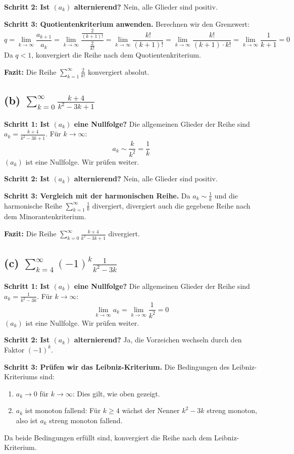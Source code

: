 \documentclass[11pt]{article}
\begin{document}
\textbf{Schritt 2: Ist \((a_k)\) alternierend?}
Nein, alle Glieder sind positiv.

\textbf{Schritt 3: Quotientenkriterium anwenden.}
Berechnen wir den Grenzwert:
\[
q = \lim_{k \to \infty} \frac{a_{k+1}}{a_k} = \lim_{k \to \infty} \frac{\frac{2}{(k+1)!}}{\frac{2}{k!}} = \lim_{k \to \infty} \frac{k!}{(k+1)!} = \lim_{k \to \infty} \frac{k!}{(k+1) \cdot k!} = \lim_{k \to \infty} \frac{1}{k+1} = 0
\]
Da \(q < 1\), konvergiert die Reihe nach dem Quotientenkriterium.

\textbf{Fazit:} Die Reihe \(\sum_{k=1}^\infty \frac{2}{k!}\) konvergiert absolut.

\subsection*{(b) \(\sum_{k=0}^\infty \frac{k+4}{k^2 - 3k + 1}\)}

\textbf{Schritt 1: Ist \((a_k)\) eine Nullfolge?}
Die allgemeinen Glieder der Reihe sind \(a_k = \frac{k+4}{k^2 - 3k + 1}\). Für \(k \to \infty\):
\[
a_k \sim \frac{k}{k^2} = \frac{1}{k}
\]
\((a_k)\) ist eine Nullfolge. Wir prüfen weiter.

\textbf{Schritt 2: Ist \((a_k)\) alternierend?}
Nein, alle Glieder sind positiv.

\textbf{Schritt 3: Vergleich mit der harmonischen Reihe.}
Da \(a_k \sim \frac{1}{k}\) und die harmonische Reihe \(\sum_{k=1}^\infty \frac{1}{k}\) divergiert, divergiert auch die gegebene Reihe nach dem Minorantenkriterium.

\textbf{Fazit:} Die Reihe \(\sum_{k=0}^\infty \frac{k+4}{k^2 - 3k + 1}\) divergiert.

\subsection*{(c) \(\sum_{k=4}^\infty (-1)^k \frac{1}{k^2 - 3k}\)}

\textbf{Schritt 1: Ist \((a_k)\) eine Nullfolge?}
Die allgemeinen Glieder der Reihe sind \(a_k = \frac{1}{k^2 - 3k}\). Für \(k \to \infty\):
\[
\lim_{k \to \infty} a_k = \lim_{k \to \infty} \frac{1}{k^2} = 0
\]
\((a_k)\) ist eine Nullfolge. Wir prüfen weiter.

\textbf{Schritt 2: Ist \((a_k)\) alternierend?}
Ja, die Vorzeichen wechseln durch den Faktor \((-1)^k\).

\textbf{Schritt 3: Prüfen wir das Leibniz-Kriterium.}
Die Bedingungen des Leibniz-Kriteriums sind:
\begin{enumerate}
    \item \(a_k \to 0\) für \(k \to \infty\): Dies gilt, wie oben gezeigt.
    \item \(a_k\) ist monoton fallend: Für \(k \geq 4\) wächst der Nenner \(k^2 - 3k\) streng monoton, also ist \(a_k\) streng monoton fallend.
\end{enumerate}
Da beide Bedingungen erfüllt sind, konvergiert die Reihe nach dem Leibniz-Kriterium.
\end{document}

